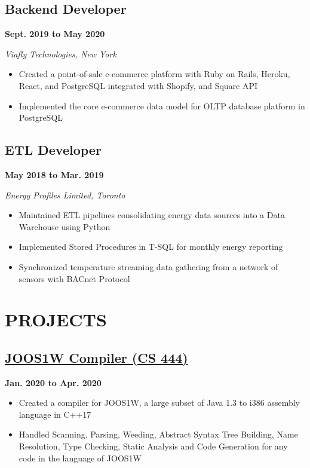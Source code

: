 \documentclass[12pt]{extarticle}
\begin{document}
\subsection*{Backend Developer} \hfill \textbf{Sept. 2019 to May 2020}

\textit{Viafly Technologies, New York}
\begin{itemize}
  \item Created a point-of-sale e-commerce platform with Ruby on Rails, Heroku, React, and PostgreSQL integrated with Shopify, and Square API
  \item Implemented the core e-commerce data model for OLTP database platform in PostgreSQL
\end{itemize}

\subsection*{ETL Developer} \hfill \textbf{May 2018 to Mar. 2019}

\textsl{Energy Profiles Limited, Toronto}
\begin{itemize}
  \item Maintained ETL pipelines consolidating energy data sources into a Data Warehouse using Python
  \item Implemented Stored Procedures in T-SQL for monthly energy reporting
  \item Synchronized temperature streaming data gathering from a network of sensors with BACnet Protocol
\end{itemize}



\section*{PROJECTS}
\subsection*{\href{https://github.com/crash-overdrive/SLC}{JOOS1W Compiler (CS 444)}
} \hfill \textbf{Jan. 2020 to Apr. 2020}
\begin{itemize}
  \item Created a compiler for JOOS1W, a large subset of Java 1.3 to i386 assembly language in C++17
  \item Handled Scanning, Parsing, Weeding, Abstract Syntax Tree Building, Name Resolution, Type Checking, Static Analysis and Code Generation for any code in the language of JOOS1W
\end{itemize}
\end{document}
